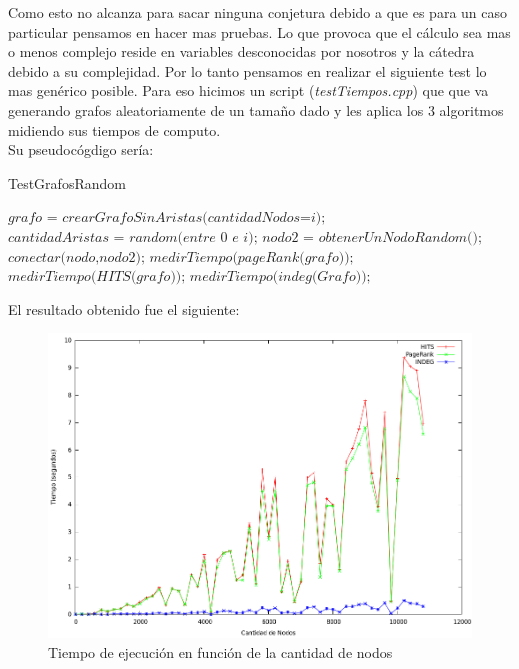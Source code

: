 Como esto no alcanza para sacar ninguna conjetura debido a que es para un caso particular pensamos en hacer mas pruebas. Lo que provoca que el cálculo sea mas o menos complejo reside en variables desconocidas por nosotros y la cátedra debido a su complejidad. Por lo tanto pensamos en realizar el siguiente test lo mas genérico posible. Para eso hicimos un script (\textit{testTiempos.cpp}) que que va generando grafos aleatoriamente de un tamaño dado y les aplica los 3 algoritmos midiendo sus tiempos de computo.\\ 
\clearpage
Su pseudocógdigo sería:
\begin{algorithm}
\caption{TestGrafosRandom}\label{euclid}
\begin{algorithmic}[1]
	\State $\textit{grafo = crearGrafoSinAristas(cantidadNodos=i);}$
		\State $\textit{cantidadAristas = random(entre 0 e i);}$
		\State $\textit{nodo2 = obtenerUnNodoRandom();}$
		\State $\textit{conectar(nodo,nodo2);}$
		\EndFor
	\EndFor	
	\State $\textit{medirTiempo(pageRank(grafo));}$
	\State $\textit{medirTiempo(HITS(grafo));}$
	\State $\textit{medirTiempo(indeg(Grafo));}$
\EndFor
\end{algorithmic}
\end{algorithm}

El resultado obtenido fue el siguiente:
 \begin{figure}[!htb]
 \begin{center}
    \includegraphics[scale=0.4]{imagenes/grafico_tiempos_sin_filtro.png}
    \caption{Tiempo de ejecución en función de la cantidad de nodos}
    \end{center}
 \end{figure}









